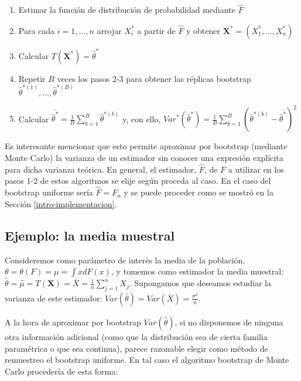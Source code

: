 \documentclass[]{book}
\theoremstyle{break}
\theoremstyle{definition}
\theoremstyle{definition}
\theoremstyle{definition}
\theoremstyle{remark}
\begin{document}
\begin{enumerate}
\def\labelenumi{\arabic{enumi}.}
\item
  Estimar la función de distribución de probabilidad mediante
  \(\hat{ F}\)
\item
  Para cada \(i=1,\ldots ,n\) arrojar \(X_i^{\ast}\) a partir de
  \(\hat{F}\) y obtener
  \(\mathbf{X}^{\ast}=\left( X_1^{\ast}, \ldots, X_n^{\ast} \right)\)
\item
  Calcular \(T\left( \mathbf{X}^{\ast} \right) = \hat{\theta}^{\ast}\)
\item
  Repetir \(B\) veces los pasos 2-3 para obtener las réplicas bootstrap
  \(\hat{\theta}^{\ast (1)}, \ldots, \hat{\theta}^{\ast(B)}\)
\item
  Calcular
  \(\overline{\hat{\theta}^{\ast}}=\frac{1}{B}\sum_{b=1}^{B}\hat{ \theta}^{\ast (b)}\)
  y, con ello,
  \(Var^{\ast}\left( \hat{\theta}^{\ast} \right) =\frac{1}{B}\sum_{b=1}^{B}\left( \hat{\theta}^{\ast \left(b \right)}-\overline{\hat{\theta}^{\ast}} \right)^2\)
\end{enumerate}

Es interesante mencionar que esto permite aproximar por bootstrap
(mediante Monte Carlo) la varianza de un estimador sin conocer una
expresión explícita para dicha varianza teórica. En general, el
estimador, \(\hat{F}\), de \(F\) a utilizar en los pasos 1-2 de estos
algoritmos se elije según proceda al caso. En el caso del bootstrap
uniforme sería \(\hat{F}=F_n\) y se puede proceder como se mostró en la
Sección \ref{intro-implementacion}.

\subsection{Ejemplo: la media muestral}\label{ejemplo-la-media-muestral}

Consideremos como parámetro de interés la media de la población,
\(\theta =\theta \left( F \right) =\mu =\int xdF\left( x \right)\), y
tomemos como estimador la media muestral:
\(\hat{\theta}=\hat{\mu}=T\left( \mathbf{X} \right) =\bar{X}=\frac{1}{n}\sum_{j=1}^{n}X_j\).
Supongamos que deseamos estudiar la varianza de este estimador:
\(Var\left( \hat{\theta} \right) =Var\left( \bar{X} \right) =\frac{\sigma^2}{n}\).

A la hora de aproximar por bootstrap \(Var\left( \hat{\theta} \right)\),
si no disponemos de ninguna otra información adicional (como que la
distribución sea de cierta familia paramétrica o que sea continua),
parece razonable elegir como método de remuestreo el bootstrap uniforme.
En tal caso el algoritmo bootstrap de Monte Carlo procedería de esta
forma:
\end{document}
